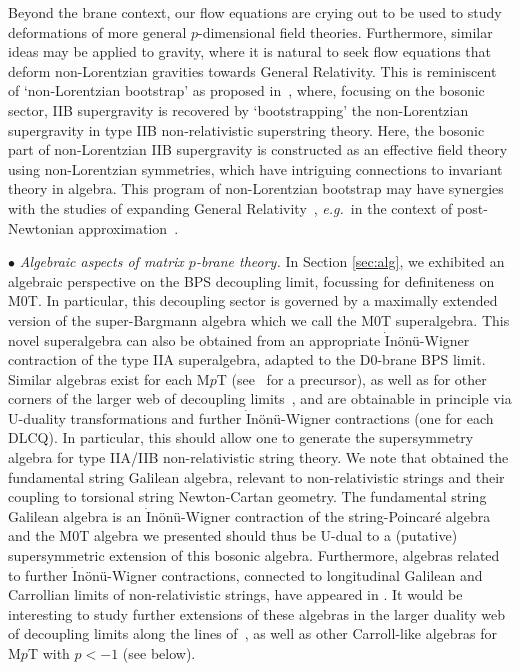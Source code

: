 \documentclass[11pt]{article}
\renewcommand{\emph}[1]{\textit{#1}}
\begin{document}
Beyond the brane context, our flow equations are crying out to be used to study deformations of more general $p$-dimensional field theories. Furthermore, similar ideas may be applied to gravity, where it is natural to seek flow equations that deform non-Lorentzian gravities towards General Relativity. This is reminiscent of `non-Lorentzian bootstrap' as proposed in~\cite{Bergshoeff:2023ogz}, where, focusing on the bosonic sector, IIB supergravity is recovered by `bootstrapping' the non-Lorentzian supergravity in type IIB non-relativistic superstring theory. Here, the bosonic part of non-Lorentzian IIB supergravity is constructed as an effective field theory using non-Lorentzian symmetries, which have intriguing connections to invariant theory in algebra. This program of non-Lorentzian bootstrap may have synergies with the studies of expanding General Relativity~\cite{VandenBleeken:2017rij, Hansen:2019pkl, Hansen:2020pqs, Hansen:2021fxi}, \emph{e.g.}~in the context of post-Newtonian approximation~\cite{Hartong:2023ckn}.



\vspace{3mm}
\noindent $\bullet$ 
\emph{Algebraic aspects of matrix $p$-brane theory.} %
In Section \ref{sec:alg}, we exhibited an algebraic perspective on the BPS decoupling limit, focussing for definiteness on  M0T.  In particular, this decoupling sector is governed by a  maximally extended version of the super-Bargmann algebra which we call the M0T superalgebra. This novel superalgebra can also be obtained from an appropriate $\dot{\text{I}}$nönü-Wigner contraction of the type IIA superalgebra, adapted to the D0-brane BPS limit. Similar algebras exist for each M$p$T (see~\cite{Brugues:2006yd} for a precursor), as well as for other corners of the larger web of decoupling limits~\cite{Blair:2023noj, Gomis:2023eav}, and are obtainable in principle via U-duality transformations and further $\dot{\text{I}}$nönü-Wigner contractions (one for each DLCQ). 
In particular, this should allow one to generate the supersymmetry algebra for type IIA/IIB non-relativistic string theory. 
We note that \cite{Bidussi:2021ujm}
obtained the fundamental string Galilean algebra, relevant to non-relativistic strings and their coupling to torsional string Newton-Cartan geometry. The fundamental string Galilean algebra is an $\dot{\text{I}}$nönü-Wigner contraction of the string-Poincar\'e algebra and the M0T algebra we presented should thus be U-dual to a (putative) supersymmetric extension of this bosonic algebra.
Furthermore, algebras related to further $\dot{\text{I}}$nönü-Wigner contractions, connected to longitudinal Galilean and Carrollian limits of non-relativistic strings, have appeared in \cite{Bidussi:2023rfs}. It would be interesting to study further extensions of these algebras in the larger duality web of decoupling limits along the lines of~\cite{Blair:2023noj, Gomis:2023eav}, as well as other Carroll-like algebras for M$p$T with $p < -1$ (see below).
\end{document}
